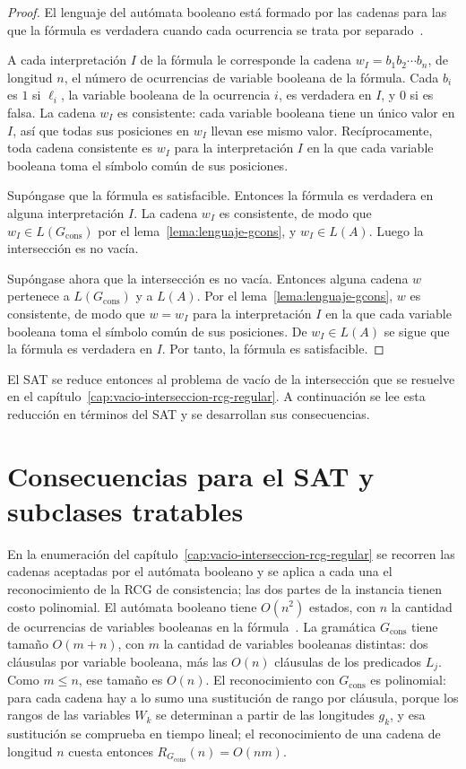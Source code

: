 \documentclass{report}
\theoremstyle{definition}
\theoremstyle{plain}
\begin{document}
\begin{proof}
El lenguaje del autómata booleano está formado por las cadenas para
las que la fórmula es verdadera cuando cada ocurrencia se trata por
separado~\cite{fernandezarias2007}.

A cada interpretación $I$ de la fórmula le corresponde la cadena
$w_I = b_1 b_2 \cdots b_n$, de longitud $n$, el número de ocurrencias
de variable booleana de la fórmula. Cada $b_i$ es $1$ si $\ell_i$, la variable booleana de la ocurrencia
$i$, es verdadera en $I$, y $0$ si es falsa. La cadena $w_I$ es consistente: cada variable booleana tiene un único
valor en $I$, así que todas sus posiciones en $w_I$ llevan ese mismo
valor. Recíprocamente, toda cadena consistente es $w_I$ para la
interpretación $I$ en la que cada variable booleana toma el símbolo
común de sus posiciones.

Supóngase que la fórmula es satisfacible. Entonces la fórmula es
verdadera en alguna interpretación $I$. La cadena $w_I$ es consistente,
de modo que $w_I \in L(G_{\mathrm{cons}})$ por el
lema~\ref{lema:lenguaje-gcons}, y $w_I \in L(A)$. Luego la
intersección es no vacía.

Supóngase ahora que la intersección es no vacía. Entonces alguna
cadena $w$ pertenece a $L(G_{\mathrm{cons}})$ y a $L(A)$. Por el
lema~\ref{lema:lenguaje-gcons}, $w$ es consistente, de modo que
$w = w_I$ para la interpretación $I$ en la que cada variable booleana
toma el símbolo común de sus posiciones. De $w_I \in L(A)$ se sigue que
la fórmula es verdadera en $I$. Por tanto, la fórmula es satisfacible.
\end{proof}

El SAT se reduce entonces al problema de vacío de la intersección que
se resuelve en el capítulo~\ref{cap:vacio-interseccion-rcg-regular}. A
continuación se lee esta reducción en términos del SAT y se desarrollan
sus consecuencias.

\section{Consecuencias para el SAT y subclases tratables}
\label{sec:lectura-sat}

En la enumeración del capítulo~\ref{cap:vacio-interseccion-rcg-regular}
se recorren las cadenas aceptadas por el autómata booleano y se aplica
a cada una el reconocimiento de la RCG de consistencia; las dos partes
de la instancia tienen costo polinomial. El autómata booleano tiene
$O(n^2)$ estados, con $n$ la cantidad de
ocurrencias de variables booleanas en la fórmula~\cite{fernandezarias2007}. La gramática
$G_{\mathrm{cons}}$ tiene tamaño $O(m + n)$, con $m$ la cantidad de
variables booleanas distintas: dos cláusulas por variable booleana, más
las $O(n)$ cláusulas de los predicados $L_j$. Como $m \le n$, ese tamaño
es $O(n)$. El reconocimiento con
$G_{\mathrm{cons}}$ es polinomial: para cada cadena hay a lo sumo una
sustitución de rango por cláusula, porque los rangos de las variables
$W_k$ se determinan a partir de las longitudes $g_k$, y esa sustitución
se comprueba
en tiempo lineal; el reconocimiento de una cadena de longitud $n$
cuesta entonces $R_{G_{\mathrm{cons}}}(n) = O(nm)$.
\end{document}
